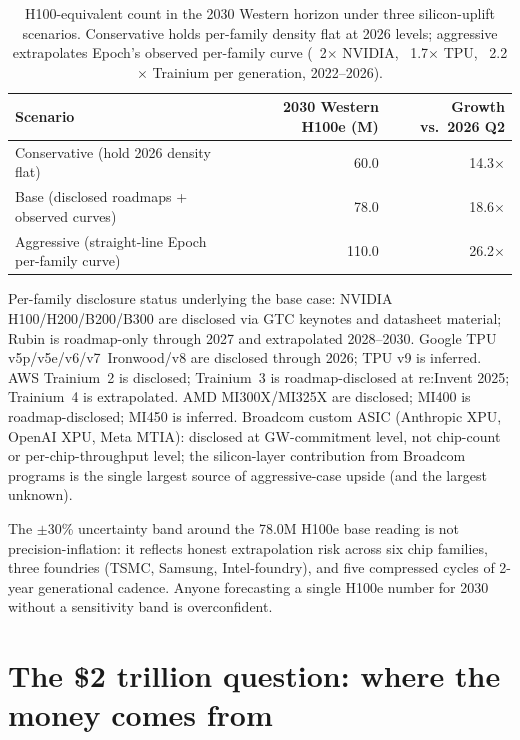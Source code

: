 \documentclass[11pt,a4paper]{article}
\begin{document}
\begin{table}[htbp]
\centering
\small
\begin{tabular}{@{}lrr@{}}
\toprule
\textbf{Scenario} & \textbf{2030 Western H100e (M)} & \textbf{Growth vs.\ 2026 Q2} \\
\midrule
Conservative (hold 2026 density flat) & 60.0 & 14.3$\times$ \\
Base (disclosed roadmaps + observed curves) & 78.0 & 18.6$\times$ \\
Aggressive (straight-line Epoch per-family curve) & 110.0 & 26.2$\times$ \\
\bottomrule
\end{tabular}
\caption{H100-equivalent count in the 2030 Western horizon under three silicon-uplift scenarios. Conservative holds per-family density flat at 2026 levels; aggressive extrapolates Epoch's observed per-family curve (~2$\times$ NVIDIA, ~1.7$\times$ TPU, ~2.2$\times$ Trainium per generation, 2022--2026).}
\end{table}

Per-family disclosure status underlying the base case: NVIDIA H100/H200/B200/B300 are disclosed via GTC keynotes and datasheet material; Rubin is roadmap-only through 2027 and extrapolated 2028--2030. Google TPU v5p/v5e/v6/v7~Ironwood/v8 are disclosed through 2026; TPU v9 is inferred. AWS Trainium~2 is disclosed; Trainium~3 is roadmap-disclosed at re:Invent 2025; Trainium~4 is extrapolated. AMD MI300X/MI325X are disclosed; MI400 is roadmap-disclosed; MI450 is inferred. Broadcom custom ASIC (Anthropic XPU, OpenAI XPU, Meta MTIA): disclosed at GW-commitment level, not chip-count or per-chip-throughput level; the silicon-layer contribution from Broadcom programs is the single largest source of aggressive-case upside (and the largest unknown).

The $\pm$30\% uncertainty band around the 78.0M H100e base reading is not precision-inflation: it reflects honest extrapolation risk across six chip families, three foundries (TSMC, Samsung, Intel-foundry), and five compressed cycles of 2-year generational cadence. Anyone forecasting a single H100e number for 2030 without a sensitivity band is overconfident.

\section{The \$2 trillion question: where the money comes from}
\label{sec:capital}
\end{document}
